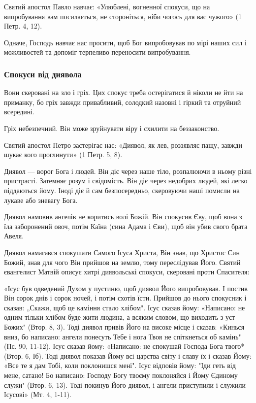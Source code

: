 \documentclass[main.tex]{subfiles}
\begin{document}
Святий апостол Павло навчає: «Улюблені, вогненної спокуси, що на випробування вам посилається, не стороніться, ніби чогось для вас чужого» (1 Петр. 4, 12).

Одначе, Господь навчає нас просити, щоб Бог випробовував по мірі наших сил і можливостей та допоміг терпеливо переносити випробування.

\subsubsection{Спокуси від диявола}

Вони скеровані на зло і гріх. Цих спокус треба остерігатися й ніколи не йти на приманку, бо гріх завжди привабливий, солодкий назовні і гіркий та отруйний всередині.

Гріх небезпечний. Він може зруйнувати віру і схилити на беззаконство.

Святий апостол Петро застерігає нас: «Диявол, як лев, роззявляє пащу, завжди шукає кого проглинути» (1 Петр. 5, 8).

Диявол — ворог Бога і людей. Він діє через наше тіло, розпалюючи в ньому різні пристрасті. Затемняє розум і свідомість. Він діє через недобрих людей, які легко піддаються йому. Іноді діє й сам безпосередньо, скеровуючи наші помисли на лукаве або зневагу Бога.

Диявол намовив ангелів не коритись волі Божій. Він спокусив Єву, щоб вона з їла заборонений овоч, потім Каїна (сина Адама і Єви), щоб він убив свого брата Авеля.

Диявол намагався спокушати Самого Ісуса Христа, Він знав, що Христос Син Божий, знав для чого Він прийшов на землю, тому переслідував Його. Святий євангелист Матвій описує хитрі диявольські спокуси, скеровані проти Спасителя:

«Ісус був одведений Духом у пустиню, щоб диявол Його випробовував. І постив Він сорок днів і сорок ночей, і потім схотів їсти. Прийшов до нього спокусник і сказав: „Скажи, щоб це каміння стало хлібом". Ісус сказав йому: «Написано: не одним тільки хлібом буде жити людина, а всяким словом, що виходить з уст Божих" (Втор. 8, 3). Тоді диявол привів Його на високе місце і сказав: «Кинься вниз, бо написано: ангели понесуть Тебе і нога Твоя не спіткнеться об камінь" (Пс. 90, 11-12). Ісус сказав йому: «Написано: не спокушай Господа Бога твого* (Втор. 6,
Іб). Тоді диявол показав Йому всі царства світу і славу їх і сказав Йому: «Все те я дам Тобі, коли поклонишся мені". Ісус відповів йому: "Іди геть від мене, сатано! Бо написано: Господу Богу твоєму поклоняйся і Йому Єдиному служи" (Втор. 6, 13). Тоді покинув Його диявол, і ангели приступили і служили Ісусові» (Мт. 4, 1-11).
\end{document}
